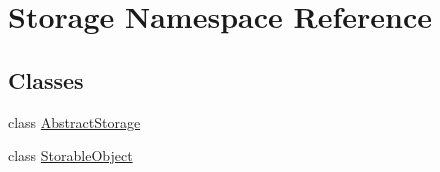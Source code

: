 \hypertarget{namespaceStorage}{
\section{Storage Namespace Reference}
\label{de/d4e/namespaceStorage}
}
\subsection*{Classes}
\begin{DoxyCompactItemize}
\item 
class \hyperlink{classStorage_1_1AbstractStorage}{AbstractStorage}
\item 
class \hyperlink{classStorage_1_1StorableObject}{StorableObject}
\end{DoxyCompactItemize}
